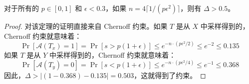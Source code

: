 \begin{theorem}\label{theo:B-3}
对于所有的 $p\in[0,1]$ 和 $\epsilon<0.3$，如果 $n=4\lceil 1/(p\epsilon^2)\rceil$，则有 $\Delta>0.5$。
\end{theorem}

\begin{proof}
对该定理的证明直接来自 Chernoff 约束。如果 $T$ 是从 $X$ 中采样得到的，Chernoff 约束就意味着：
\[
\Pr[\mathcal{A}(T_x)=1]
=\Pr[s>p(1+\epsilon)]
\leq e^{-n\cdot(p\epsilon^2/2)}
\leq e^{-2}
\leq 0.135
\]
如果 $T$ 是从 $Y$ 中采样得到的，Chernoff 约束就意味着：
\[
\Pr[\mathcal{A}(T_y)=0]
=\Pr[s<p(1+\epsilon)]
\leq e^{-n\cdot(p\epsilon^2/4)}
\leq e^{-1}
\leq 0.368
\]
因此，$\Delta>|(1-0.368)-0.135|=0.503$，这就得到了约束。
\end{proof}